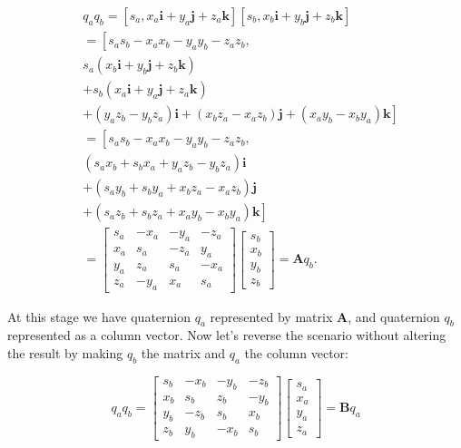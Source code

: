 $$
\begin{aligned}
& q_{a} q_{b}=\left[s_{a}, x_{a} \mathbf{i}+y_{a} \mathbf{j}+z_{a} \mathbf{k}\right]\left[s_{b}, x_{b} \mathbf{i}+y_{b} \mathbf{j}+z_{b} \mathbf{k}\right] \\
& =\left[s_{a} s_{b}-x_{a} x_{b}-y_{a} y_{b}-z_{a} z_{b},\right. \\
& s_{a}\left(x_{b} \mathbf{i}+y_{b} \mathbf{j}+z_{b} \mathbf{k}\right) \\
& +s_{b}\left(x_{a} \mathbf{i}+y_{a} \mathbf{j}+z_{a} \mathbf{k}\right) \\
& \left.+\left(y_{a} z_{b}-y_{b} z_{a}\right) \mathbf{i}+\left(x_{b} z_{a}-x_{a} z_{b}\right) \mathbf{j}+\left(x_{a} y_{b}-x_{b} y_{a}\right) \mathbf{k}\right] \\
& =\left[s_{a} s_{b}-x_{a} x_{b}-y_{a} y_{b}-z_{a} z_{b}\right. \text {, } \\
& \left(s_{a} x_{b}+s_{b} x_{a}+y_{a} z_{b}-y_{b} z_{a}\right) \mathbf{i} \\
& +\left(s_{a} y_{b}+s_{b} y_{a}+x_{b} z_{a}-x_{a} z_{b}\right) \mathbf{j} \\
& \left.+\left(s_{a} z_{b}+s_{b} z_{a}+x_{a} y_{b}-x_{b} y_{a}\right) \mathbf{k}\right] \\
& =\left[\begin{array}{cccc}s_{a} & -x_{a} & -y_{a} & -z_{a} \\x_{a} & s_{a} & -z_{a} & y_{a} \\y_{a} & z_{a} & s_{a} & -x_{a} \\z_{a} & -y_{a} & x_{a} & s_{a}\end{array}\right]\left[\begin{array}{c}s_{b} \\x_{b} \\y_{b} \\z_{b}\end{array}\right]=\mathbf{A} q_{b} .
\end{aligned}
$$

At this stage we have quaternion $q_{a}$ represented by matrix $\mathbf{A}$, and quaternion $q_{b}$ represented as a column vector. Now let's reverse the scenario without altering the result by making $q_{b}$ the matrix and $q_{a}$ the column vector:

$$
q_{a} q_{b}=\left[\begin{array}{cccc}
s_{b} & -x_{b} & -y_{b} & -z_{b} \\
x_{b} & s_{b} & z_{b} & -y_{b} \\
y_{b} & -z_{b} & s_{b} & x_{b} \\
z_{b} & y_{b} & -x_{b} & s_{b}
\end{array}\right]\left[\begin{array}{c}
s_{a} \\
x_{a} \\
y_{a} \\
z_{a}
\end{array}\right]=\mathbf{B} q_{a}
$$

